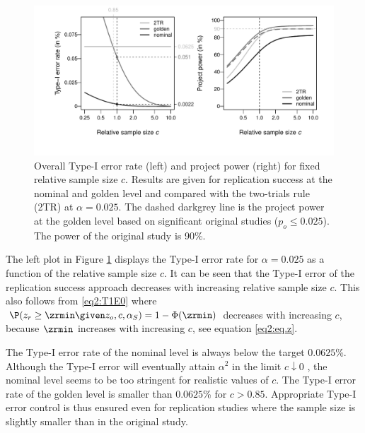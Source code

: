 \begin{figure}[!h]
\centering

\begin{knitrout}
\color{fgcolor}

{\centering \includegraphics[width=\maxwidth]{images/paper2/fig4-1}

}

\end{knitrout}

\caption{Overall Type-I error rate (left) and project power (right) for fixed
  relative sample size $c$. Results are given for replication success at the
  nominal and golden level and compared with the two-trials rule (2TR) at
  $\alpha = 0.025$. The dashed darkgrey line is the project power at the golden
  level based on significant original studies ($p_o \leq 0.025$). The power of
  the original study is 90\%.}
\label{fig2:fig4}
\end{figure}


The left plot in Figure \ref{fig2:fig4} displays the Type-I error rate for
$\alpha=0.025$ as a function of the relative sample size $c$. It can be seen
that the Type-I error of the replication success approach decreases with
increasing relative sample size $c$. This also follows from \eqref{eq2:T1E0}
where $\P(z_r \geq \zrmin \given z_o, c, \alpha_S) = 1 - \Phi(\zrmin)$ decreases
with increasing $c$, because $\zrmin$ increases with increasing $c$, see
equation \eqref{eq2:eq.z}.


The Type-I error rate of the nominal level is always below the target
$0.0625$\%. Although the Type-I error will eventually attain $\alpha^2$ in the
limit $c \downarrow 0$ \citep[Section 3.4]{Held2020}, the nominal level seems to
be too stringent for realistic values of $c$. The Type-I error rate of the
golden level is smaller than $0.0625$\% for $c >0.85$. Appropriate Type-I error
control is thus ensured even for replication studies where the sample size is
slightly smaller than in the original study.


